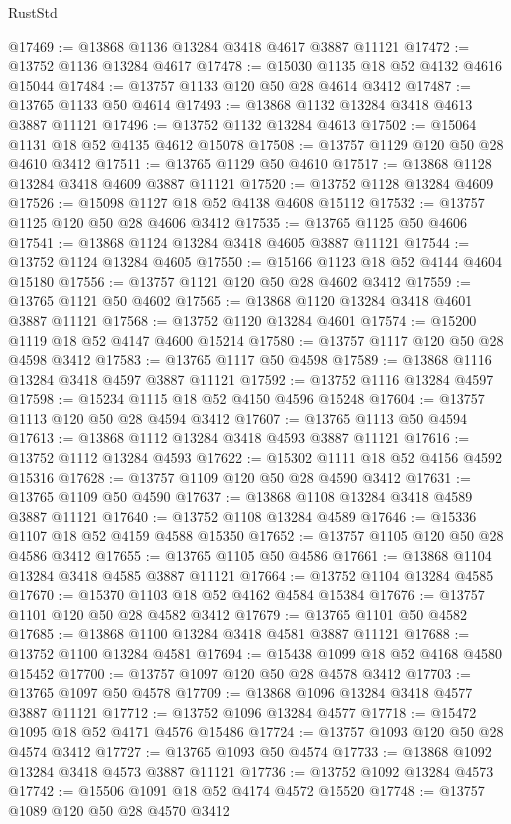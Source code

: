 \begin{lexlean}{RustStd}
\begin{coremodule}
@17469 := @13868 @1136 @13284 @3418 @4617 @3887 @11121
@17472 := @13752 @1136 @13284 @4617
@17478 := @15030 @1135 @18 @52 @4132 @4616 @15044
@17484 := @13757 @1133 @120 @50 @28 @4614 @3412
@17487 := @13765 @1133 @50 @4614
@17493 := @13868 @1132 @13284 @3418 @4613 @3887 @11121
@17496 := @13752 @1132 @13284 @4613
@17502 := @15064 @1131 @18 @52 @4135 @4612 @15078
@17508 := @13757 @1129 @120 @50 @28 @4610 @3412
@17511 := @13765 @1129 @50 @4610
@17517 := @13868 @1128 @13284 @3418 @4609 @3887 @11121
@17520 := @13752 @1128 @13284 @4609
@17526 := @15098 @1127 @18 @52 @4138 @4608 @15112
@17532 := @13757 @1125 @120 @50 @28 @4606 @3412
@17535 := @13765 @1125 @50 @4606
@17541 := @13868 @1124 @13284 @3418 @4605 @3887 @11121
@17544 := @13752 @1124 @13284 @4605
@17550 := @15166 @1123 @18 @52 @4144 @4604 @15180
@17556 := @13757 @1121 @120 @50 @28 @4602 @3412
@17559 := @13765 @1121 @50 @4602
@17565 := @13868 @1120 @13284 @3418 @4601 @3887 @11121
@17568 := @13752 @1120 @13284 @4601
@17574 := @15200 @1119 @18 @52 @4147 @4600 @15214
@17580 := @13757 @1117 @120 @50 @28 @4598 @3412
@17583 := @13765 @1117 @50 @4598
@17589 := @13868 @1116 @13284 @3418 @4597 @3887 @11121
@17592 := @13752 @1116 @13284 @4597
@17598 := @15234 @1115 @18 @52 @4150 @4596 @15248
@17604 := @13757 @1113 @120 @50 @28 @4594 @3412
@17607 := @13765 @1113 @50 @4594
@17613 := @13868 @1112 @13284 @3418 @4593 @3887 @11121
@17616 := @13752 @1112 @13284 @4593
@17622 := @15302 @1111 @18 @52 @4156 @4592 @15316
@17628 := @13757 @1109 @120 @50 @28 @4590 @3412
@17631 := @13765 @1109 @50 @4590
@17637 := @13868 @1108 @13284 @3418 @4589 @3887 @11121
@17640 := @13752 @1108 @13284 @4589
@17646 := @15336 @1107 @18 @52 @4159 @4588 @15350
@17652 := @13757 @1105 @120 @50 @28 @4586 @3412
@17655 := @13765 @1105 @50 @4586
@17661 := @13868 @1104 @13284 @3418 @4585 @3887 @11121
@17664 := @13752 @1104 @13284 @4585
@17670 := @15370 @1103 @18 @52 @4162 @4584 @15384
@17676 := @13757 @1101 @120 @50 @28 @4582 @3412
@17679 := @13765 @1101 @50 @4582
@17685 := @13868 @1100 @13284 @3418 @4581 @3887 @11121
@17688 := @13752 @1100 @13284 @4581
@17694 := @15438 @1099 @18 @52 @4168 @4580 @15452
@17700 := @13757 @1097 @120 @50 @28 @4578 @3412
@17703 := @13765 @1097 @50 @4578
@17709 := @13868 @1096 @13284 @3418 @4577 @3887 @11121
@17712 := @13752 @1096 @13284 @4577
@17718 := @15472 @1095 @18 @52 @4171 @4576 @15486
@17724 := @13757 @1093 @120 @50 @28 @4574 @3412
@17727 := @13765 @1093 @50 @4574
@17733 := @13868 @1092 @13284 @3418 @4573 @3887 @11121
@17736 := @13752 @1092 @13284 @4573
@17742 := @15506 @1091 @18 @52 @4174 @4572 @15520
@17748 := @13757 @1089 @120 @50 @28 @4570 @3412

\end{coremodule}
\end{lexlean}
